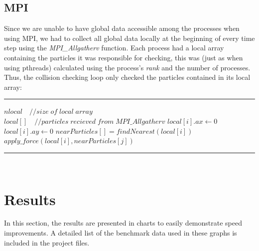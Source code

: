 \documentclass[11pt,a4paper]{article}
\begin{document}
\subsection{MPI}
Since we are unable to have global data accessible among the processes when using MPI, we had to collect all global data locally at the beginning of every time step using the \emph{MPI\_Allgatherv} function. Each process had a local array containing the particles it was responsible for checking, this was (just as when using pthreads) calculated using the process's \emph{rank} and the number of processes. Thus, the collision checking loop only checked the particles contained in its local array:
\\
\rule{125mm}{0.1pt}
\begin{algorithmic}
\STATE $nlocal\quad //size\;of\;local\;array$
\STATE $local[]\quad //particles\;recieved\;from\;MPI\_Allgatherv$
	\STATE $local[i].ax \gets 0$
	\STATE $local[i].ay \gets 0$
	\STATE $nearParticles[] = findNearest(local[i])$
			\STATE $apply\_force(local[i],nearParticles[j])$
	\ENDFOR
\ENDFOR 
\end{algorithmic}
\rule{125mm}{0.1pt}
\vspace{10pt}
\\
\newpage
\section{Results}
In this section, the results are presented in charts to easily demonstrate speed improvements. A detailed list of the benchmark data used in these graphs is included in the project files.
\end{document}
